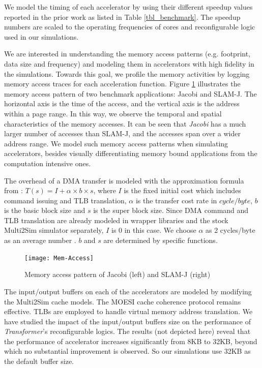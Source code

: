 We model the timing of each accelerator by using their different
speedup values reported in the prior work as listed in Table
\ref{tbl_benchmark}. The speedup numbers are scaled to the 
operating frequencies of cores and reconfigurable logic used in our
simulations. 

We are interested in understanding the memory access
patterns (e.g. footprint, data size and frequency) and modeling
them in accelerators with high fidelity in the simulations. Towards this goal, we profile the memory
activities by logging memory access traces for each 
acceleration function.
Figure \ref{fig_mem_access} illustrates the memory access pattern of
two benchmark applications: Jacobi and SLAM-J. The horizontal axis is
the time of the access, and the vertical axis is the address within a
page range. In this way, we observe the temporal and spatial
characteristics of the memory accesses. It can be seen that {\em
  Jacobi} has a much larger number of  accesses than SLAM-J, and the
accesses span over a wider address range. We model such memory
access patterns when simulating accelerators, besides visually
differentiating memory bound applications from the computation intensive
ones. 

The overhead of a DMA transfer is modeled with the approximation
formula from \cite{Saidi:2012}: $ T(s) = I + \alpha \times b \times
s$, where $I$ is the fixed initial cost which includes command issuing
and TLB translation, $\alpha$ is the transfer cost rate in
$cycle/byte$, $b$ is the basic block size and $s$ is the super block
size. Since DMA command and TLB translation are already modeled in wrapper libraries and the
stock Multi2Sim simulator separately, $I$ is 0 in this case. We choose $\alpha$
as 2 cycles/byte as an average number \cite{Saidi:2012}. $b$ and $s$
are determined by specific functions.


\begin{figure}
    \centering
    \texttt{[image: Mem-Access]}
	\caption{Memory access pattern of Jacobi (left) and SLAM-J (right)}
\label{fig_mem_access}
\end{figure}


The input/output buffers on each of the accelerators are modeled by
modifying the Multi2Sim cache models. The MOESI cache coherence
protocol remains effective. TLBs are employed to handle virtual memory
address translation.  We have studied the impact of the input/output
buffers size on the performance of {\em Transformer}'s reconfigurable
logics. The results (not depicted here) reveal that the performance of
accelerator increases significantly from 8KB to 32KB, beyond which no
substantial improvement is observed. So our simulations use 32KB as
the default buffer size.

